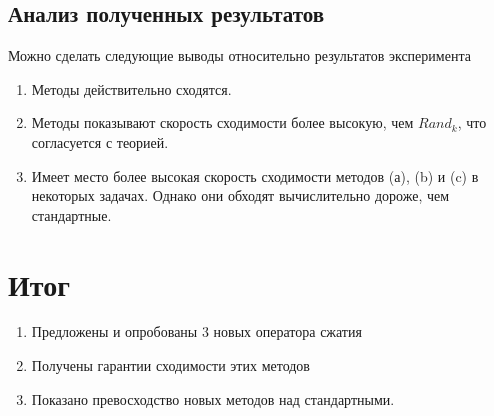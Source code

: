 \documentclass[12pt, twoside]{article}
\begin{document}
\subsection{Анализ полученных результатов}
Можно сделать следующие выводы относительно результатов эксперимента
\begin{enumerate}
    \item Методы действительно сходятся.
    \item Методы показывают скорость сходимости более высокую, чем $Rand_k$, что согласуется с теорией.
    \item Имеет место более высокая скорость сходимости методов (а), (b) и (c) в некоторых задачах. Однако они обходят вычислительно дороже, чем стандартные. 
\end{enumerate}

\section{Итог}
\begin{enumerate}
    \item Предложены и опробованы 3 новых оператора сжатия
    \item Получены гарантии сходимости этих методов
    \item Показано превосходство новых методов над стандартными.
\end{enumerate}




\end{document}
